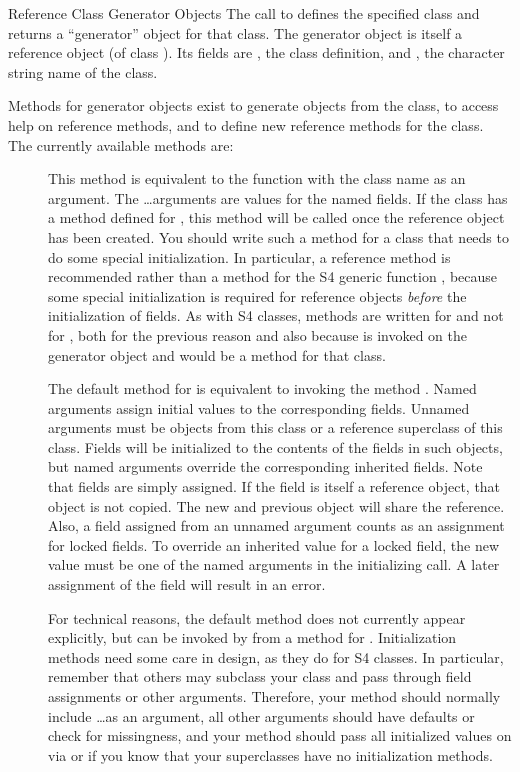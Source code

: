 \begin{Section}{Reference Class Generator Objects}
The call to  defines the specified class and
returns a ``generator'' object for that class.
The generator object is itself a reference object (of class
).
Its fields are , the class definition, and ,
the character string name of the class.

Methods for generator objects exist to generate objects
from the class, to access help on reference methods, and to
define new reference methods for the class.
The currently available methods are:
\begin{description}

\item[]  
This method is equivalent to the function  with the
class name as an argument.  The \dots arguments are values for the
named fields.
If the class has a method defined for , 
this method will be called once the reference object has been
created.  You should write such a method for a class that needs to do
some special initialization.
In particular, a reference method is recommended rather than a method
for the S4 generic function , because some special initialization is
required for reference objects \emph{before} the initialization of
fields.
As with S4 classes, methods are written for  
and not for , 
both for the previous reason and also because  
is invoked on the generator object and would be a method for that class.

The default method for  
is equivalent to invoking the method . 
Named arguments assign initial values to the corresponding fields.
Unnamed arguments must be objects from this class or a reference
superclass of this class.
Fields will be initialized to the contents of the fields in such
objects, but named arguments override the corresponding inherited
fields.
Note that fields are simply assigned.  If the field is itself a
reference object, that object is not copied.
The new and previous object will share the reference.
Also, a field assigned from an unnamed argument counts as an
assignment for locked fields.
To override an inherited value for a locked field, the new value must
be one of the named arguments in the initializing call.
A later assignment of the field will result in an error.

For technical reasons, the
default method does not currently appear explicitly, but can be
invoked by  
from a method for . 
Initialization methods need some care in design, as they do for S4
classes.
In particular, remember that others may subclass your class and pass
through field assignments or other arguments.  Therefore, your method
should normally include \dots as an argument, all other arguments
should have defaults or check for missingness, and your method should
pass all initialized values on via  or  if
you know that your superclasses have no initialization methods.



\end{description}
\end{Section}
